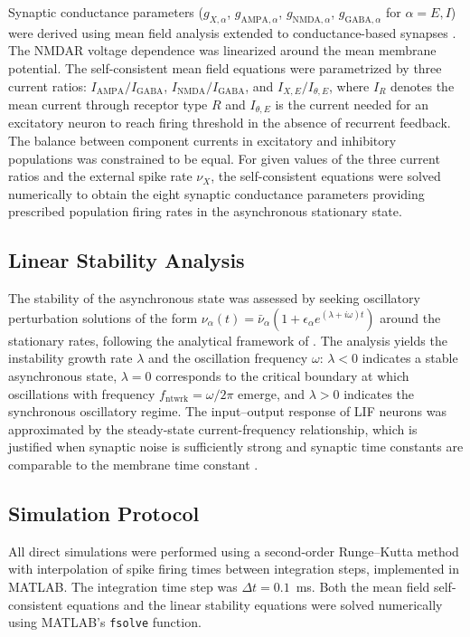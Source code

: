 \documentclass[10pt]{article}
\begin{document}
Synaptic conductance parameters ($g_{X,\alpha}$, $g_{\mathrm{AMPA},\alpha}$, $g_{\mathrm{NMDA},\alpha}$, $g_{\mathrm{GABA},\alpha}$ for $\alpha = E, I$) were derived using mean field analysis \citep{amit1997model, brunel2000dynamics, vanvreeswijk1996chaos} extended to conductance-based synapses \citep{brunel2001effects}. The NMDAR voltage dependence was linearized around the mean membrane potential. The self-consistent mean field equations were parametrized by three current ratios: $I_{\mathrm{AMPA}}/I_{\mathrm{GABA}}$, $I_{\mathrm{NMDA}}/I_{\mathrm{GABA}}$, and $I_{X,E}/I_{\theta,E}$, where $I_R$ denotes the mean current through receptor type $R$ and $I_{\theta,E}$ is the current needed for an excitatory neuron to reach firing threshold in the absence of recurrent feedback. The balance between component currents in excitatory and inhibitory populations was constrained to be equal. For given values of the three current ratios and the external spike rate $\nu_X$, the self-consistent equations were solved numerically to obtain the eight synaptic conductance parameters providing prescribed population firing rates in the asynchronous stationary state.

\subsection{Linear Stability Analysis}

The stability of the asynchronous state was assessed by seeking oscillatory perturbation solutions of the form $\nu_\alpha(t) = \bar{\nu}_\alpha(1 + \epsilon_\alpha e^{(\lambda + i\omega)t})$ around the stationary rates, following the analytical framework of \citet{brunel2003fast}. The analysis yields the instability growth rate $\lambda$ and the oscillation frequency $\omega$: $\lambda < 0$ indicates a stable asynchronous state, $\lambda = 0$ corresponds to the critical boundary at which oscillations with frequency $f_{\mathrm{ntwrk}} = \omega / 2\pi$ emerge, and $\lambda > 0$ indicates the synchronous oscillatory regime. The input--output response of LIF neurons was approximated by the steady-state current-frequency relationship, which is justified when synaptic noise is sufficiently strong and synaptic time constants are comparable to the membrane time constant \citep{brunel1999fast}.

\subsection{Simulation Protocol}

All direct simulations were performed using a second-order Runge--Kutta method with interpolation of spike firing times between integration steps, implemented in MATLAB. The integration time step was $\Delta t = 0.1$~ms. Both the mean field self-consistent equations and the linear stability equations were solved numerically using MATLAB's \texttt{fsolve} function.


\end{document}
